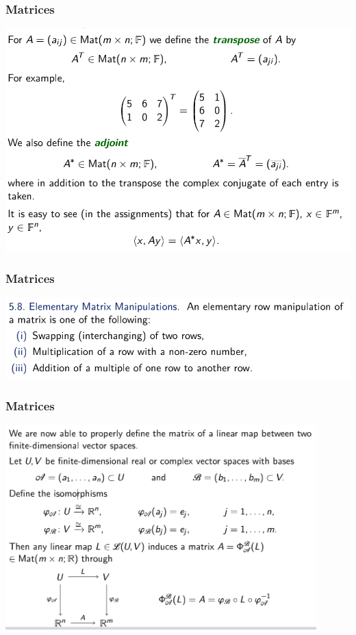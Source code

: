\documentclass[12pt, t]{beamer}
\begin{document}
\begin{frame}
    \frametitle{Matrices}
    \begin{center}
        \includegraphics[width=\textwidth]{5}
    \end{center}
\end{frame}
\begin{frame}
    \frametitle{Matrices}
    \begin{center}
        \includegraphics[width=\textwidth]{ele}
    \end{center}
\end{frame}
\begin{frame}
    \frametitle{Matrices}
    \begin{center}
        \includegraphics[width=0.9\textwidth]{6}
    \end{center}
\end{frame}
\end{document}
